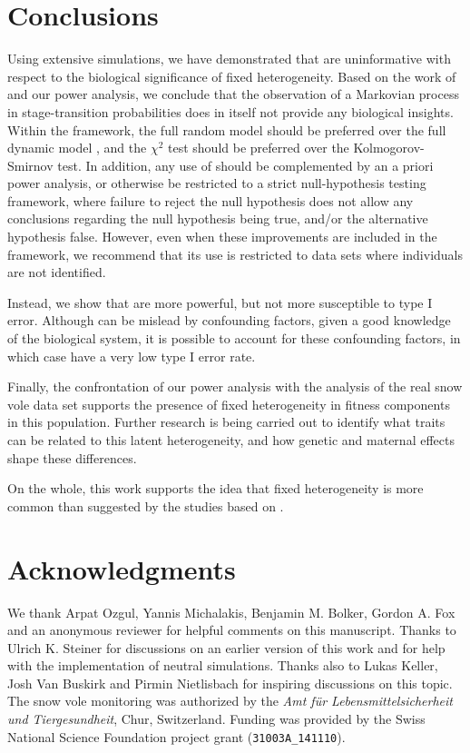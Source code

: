 \section{Conclusions}
Using extensive simulations, we have demonstrated that \NSM are uninformative with respect to the biological significance of fixed heterogeneity.
Based on the work of \cite{Plard2012} and our power analysis, we conclude that the observation of a Markovian process in stage-transition probabilities does in itself not provide any biological insights. Within the \NSM framework, the full random model \parencite{Plard2012} should be preferred over the full dynamic model \parencite{Tuljapurkar2009}, and the $\chi^2$ test should be preferred over the Kolmogorov-Smirnov test. In addition, any use of \NSM should be complemented by an a priori power analysis, or otherwise be restricted to a strict null-hypothesis testing framework, where failure to reject the null hypothesis does not allow any conclusions regarding the null hypothesis being true, and/or the alternative hypothesis false. 
However, even when these improvements are included in the \NSM framework, we recommend that its use is restricted to data sets where individuals are not identified. 

Instead, we show that \MM are more powerful, but not more susceptible to type I error. Although \MM can be mislead by confounding factors, given a good knowledge of the biological system, it is possible to account for these confounding factors, in which case \MM have a very low type I error rate. 

Finally, the confrontation of our power analysis with the analysis of the real snow vole data set supports the presence of fixed heterogeneity in fitness components in this population. Further research is being carried out to identify what traits can be related to this latent heterogeneity, and how genetic and maternal effects shape these differences.

On the whole, this work supports the idea that fixed heterogeneity is more common than suggested by the studies based on \NSM. 

\section{Acknowledgments}
We thank Arpat Ozgul, Yannis Michalakis, Benjamin M. Bolker, Gordon A. Fox and an anonymous reviewer for helpful comments on this manuscript. Thanks to Ulrich K. Steiner for discussions on an earlier version of this work and for help with the implementation of neutral simulations. Thanks also to Lukas Keller, Josh Van Buskirk and Pirmin Nietlisbach for inspiring discussions on this topic. The snow vole monitoring was authorized by the \textit{Amt f\"{u}r Lebensmittelsicherheit und Tiergesundheit}, Chur, Switzerland. Funding was provided by the Swiss National Science Foundation project grant (\verb|31003A_141110|). 

